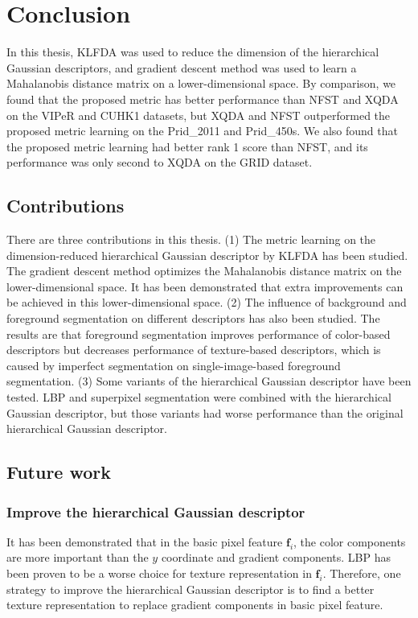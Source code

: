 
\chapter{Conclusion} %

In this thesis, KLFDA was used to reduce the dimension of the hierarchical Gaussian descriptors, and gradient descent method was used to learn a Mahalanobis distance matrix on a lower-dimensional space. By comparison, we found that the proposed metric has better performance than NFST and XQDA on the VIPeR and CUHK1 datasets, but XQDA and NFST outperformed the proposed metric learning on the Prid\_2011 and Prid\_450s. We also found that the proposed metric learning had better rank 1 score than NFST, and its performance was only second to XQDA on the GRID dataset. 
\section{Contributions}
There are three contributions in this thesis. (1) The metric learning on the dimension-reduced hierarchical Gaussian descriptor by KLFDA has been studied. The gradient descent method optimizes the Mahalanobis distance matrix on the lower-dimensional space. It has been demonstrated that extra improvements can be achieved in this lower-dimensional space. (2) The influence of background and foreground segmentation on different descriptors has also been studied. The results are that foreground segmentation improves performance of color-based descriptors but decreases performance of texture-based descriptors, which is caused by imperfect segmentation on single-image-based foreground segmentation. (3) Some variants of the hierarchical Gaussian descriptor have been tested. LBP and superpixel segmentation were combined with the hierarchical Gaussian descriptor, but those variants had worse performance than the original hierarchical Gaussian descriptor.
\section{Future work}
\subsection{Improve the hierarchical Gaussian descriptor}
It has been demonstrated that in the basic pixel feature $\bm{f}_i$, the color components are more important than the $y$ coordinate and gradient components. LBP has been proven to be a worse choice for texture representation in $\bm{f}_i$. Therefore, one strategy to improve the hierarchical Gaussian descriptor is to find a better texture representation to replace gradient components in basic pixel feature. 
